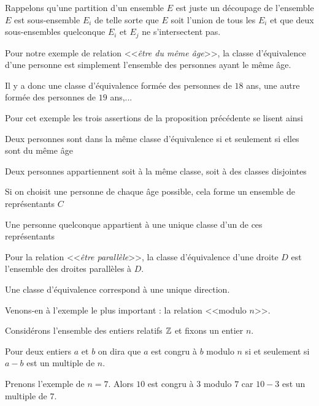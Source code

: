 \change

Rappelons qu'une partition d'un ensemble $E$ est juste un découpage de l'ensemble 
$E$ est sous-ensemble $E_i$ de telle sorte que $E$ soit l'union de tous les $E_i$
et que deux sous-ensembles quelconque $E_i$ et $E_j$ ne s'intersectent pas.



\diapo

Pour notre exemple de relation <<\emph{être du même âge}>>, la classe d'équivalence d'une personne est simplement l'ensemble
des personnes ayant le même âge. 

Il y a donc une classe d'équivalence formée des personnes
de $18$ ans, une autre formée des personnes de $19$ ans,...

Pour cet exemple les trois assertions de la proposition précédente se lisent ainsi

\change

Deux personnes sont dans la même classe d'équivalence si et seulement si elles sont du même âge

\change

Deux personnes appartiennent soit à la même classe, soit à des classes disjointes

\change

Si on choisit une personne de chaque âge possible, cela forme un ensemble de représentants $C$

Une personne quelconque appartient à une unique classe d'un de ces représentants

\change

Pour la relation <<\emph{être parallèle}>>, la classe d'équivalence d'une droite $D$
est l'ensemble des droites parallèles à $D$.


Une classe d'équivalence correspond à une unique direction.



\diapo

Venons-en à l'exemple le plus important : la relation <<modulo $n$>>.

Considérons l'ensemble des entiers relatifs $\mathbb{Z}$ et fixons un entier $n$.

Pour deux entiers $a$ et $b$ on dira que $a$ est congru à $b$ modulo $n$ si et seulement si
$a-b$ est un multiple de $n$.

\change

Prenons l'exemple de $n=7$.
Alors $10$ est congru à $3$ modulo $7$ car $10-3$ est un multiple de $7$.

